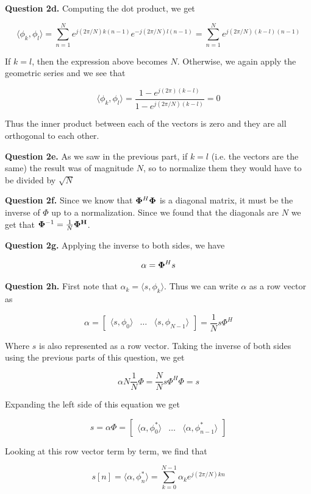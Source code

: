 \documentclass[letterpaper, reqno,11pt]{article}
\begin{document}
{\noindent\bf Question 2d.} Computing the dot product, we get 

$$
    \langle\phi_k, \phi_l\rangle=\sum_{n=1}^N e^{j(2\pi/N) k (n-1)}e^{-j(2\pi/N) l (n-1)}=\sum_{n=1}^N e^{j(2\pi/N) (k-l) (n-1)}
$$

If $k=l$, then the expression above becomes $N$. Otherwise, we again apply the geometric series and we see that 

$$
    \langle\phi_k, \phi_l\rangle=\frac{1-e^{j(2\pi) (k-l)}}{1-e^{j(2\pi/N) (k-l)}}=0
$$

Thus the inner product between each of the vectors is zero and they are all orthogonal to each other. 

{\noindent\bf Question 2e.} As we saw in the previous part, if $k=l$ (i.e. the vectors are the same) the result was of magnitude $N$, so to normalize them they would have to be divided by $\sqrt N$

{\noindent\bf Question 2f.} Since we know that ${\bf\Phi}^H{\bf\Phi}$ is a diagonal matrix, it must be the inverse of $\Phi$ up to a normalization. Since we found that the diagonals are $N$ we get that ${\bf\Phi}^{-1}=\frac1N{\bf\Phi^H}$. 

{\noindent\bf Question 2g.} Applying the inverse to both sides, we have 

$$
    \alpha={\bf\Phi}^H s
$$

{\noindent\bf Question 2h.} First note that $\alpha_k=\langle s, \phi_k\rangle$. Thus we can write $\alpha$ as a row vector as 

$$
    \alpha = \begin{bmatrix}\langle s, \phi_0\rangle&\ldots&\langle s, \phi_{N-1}\rangle\end{bmatrix}=\frac1N s\Phi^H
$$

Where $s$ is also represented as a row vector. Taking the inverse of both sides using the previous parts of this question, we get 

$$
    \alpha N\frac1N\Phi=\frac NNs\Phi^H\Phi=s
$$

Expanding the left side of this equation we get 

$$
    s=\alpha\Phi=\begin{bmatrix}\langle \alpha, \phi_0^*\rangle&\ldots&\langle \alpha, \phi_{n-1}^*\rangle\end{bmatrix}
$$

Looking at this row vector term by term, we find that 

$$
    s[n]=\langle\alpha, \phi_n^*\rangle=\sum_{k=0}^{N-1}\alpha_ke^{j(2\pi/N)kn}
$$
\end{document}
